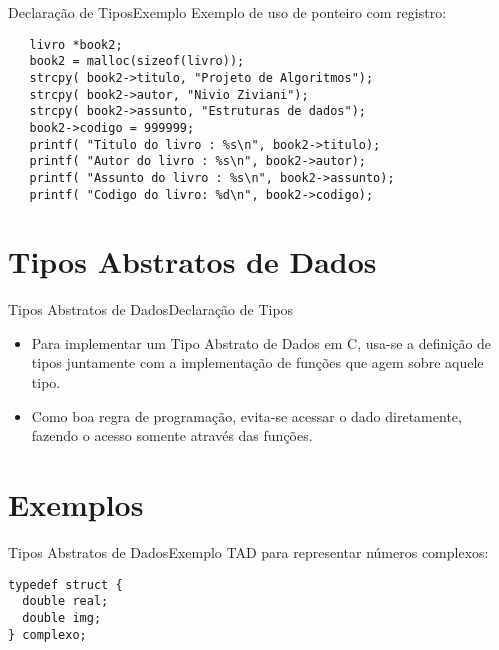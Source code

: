 \documentclass[aspectratio=169]{beamer}
\begin{document}

\begin{frame}[fragile]{Declaração de Tipos}{Exemplo}
Exemplo de uso de ponteiro com registro:
\begin{lstlisting}
   livro *book2;
   book2 = malloc(sizeof(livro));
   strcpy( book2->titulo, "Projeto de Algoritmos");
   strcpy( book2->autor, "Nivio Ziviani"); 
   strcpy( book2->assunto, "Estruturas de dados");
   book2->codigo = 999999;
   printf( "Titulo do livro : %s\n", book2->titulo);
   printf( "Autor do livro : %s\n", book2->autor);
   printf( "Assunto do livro : %s\n", book2->assunto);
   printf( "Codigo do livro: %d\n", book2->codigo);
\end{lstlisting} 
\end{frame}

\section{Tipos Abstratos de Dados}

\begin{frame}{Tipos Abstratos de Dados}{Declaração de Tipos}
\begin{itemize}
\item Para implementar um Tipo Abstrato de Dados em C, usa-se a definição de tipos juntamente com a implementação de funções que agem sobre aquele tipo. 
\item Como boa regra de programação, evita-se acessar o dado diretamente, fazendo o acesso 
somente através das funções. 
\end{itemize}
\end{frame}	

\section{Exemplos}

\begin{frame}[fragile]{Tipos Abstratos de Dados}{Exemplo}
TAD para representar números complexos:
\begin{lstlisting}
typedef struct {
  double real;
  double img;
} complexo;
\end{lstlisting} 
\end{frame}
\end{document}
